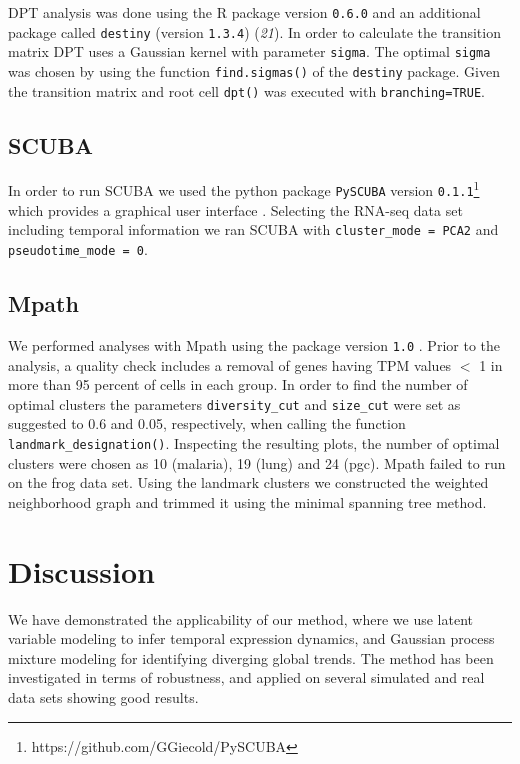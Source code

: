 DPT analysis was done using the R package version \texttt{0.6.0} and an additional package called \texttt{destiny} (version \texttt{1.3.4}) ({\it 21}). In order to calculate the transition matrix DPT uses a Gaussian kernel with parameter \texttt{sigma}. The optimal \texttt{sigma} was chosen by  using the function \texttt{find.sigmas()} of the \texttt{destiny} package. Given the transition matrix and root cell \texttt{dpt()} was executed with \texttt{branching=TRUE}.

\subsection{SCUBA}

In order to run SCUBA we used the python package \texttt{PySCUBA} version  \texttt{0.1.1}\footnote{https://github.com/GGiecold/PySCUBA} which provides a graphical user interface \cite{Marco2014-rf}. Selecting the RNA-seq data set including temporal information we ran SCUBA with  \texttt{cluster\_mode = PCA2} and \texttt{pseudotime\_mode = 0}.

\subsection{Mpath}

We performed analyses with Mpath using the package version \texttt{1.0} \cite{Chen2016-ar}. Prior to the analysis, a quality check includes a removal of genes having TPM values $ < $ 1 in more than 95 percent of cells in each group. In order to find the number of optimal clusters the parameters \texttt{diversity\_cut} and \texttt{size\_cut} were set as suggested to 0.6 and 0.05, respectively, when calling the function \texttt{landmark\_designation()}. Inspecting the resulting plots, the number of optimal clusters were chosen as 10 (malaria), 19 (lung) and 24 (pgc). Mpath failed to run on the frog data set. Using the landmark clusters we constructed the weighted neighborhood graph and trimmed it using the minimal spanning tree method. 

\section{Discussion}

We have demonstrated the applicability of our  method, where we use latent variable modeling to infer temporal expression dynamics, and Gaussian process mixture modeling for identifying diverging global trends. The method has been investigated in terms of robustness, and applied on several simulated and real data sets showing good results.

